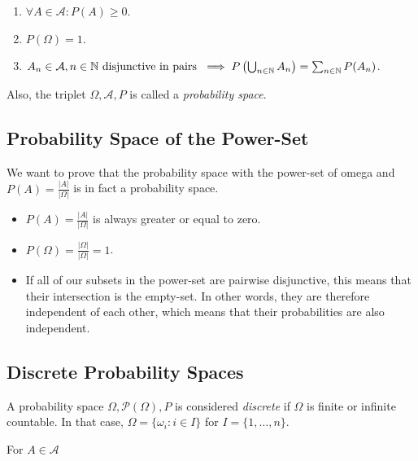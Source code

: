 \begin{enumerate}[label=\Roman*.]
    
    \item \(\forall A \in \mathcal{A}: P(A) \ge 0\).

    \item \(P(\Omega) = 1\).

    \item \(A_n \in \mathcal{A}, n \in \mathbb{N} \text{ disjunctive in pairs } \implies P\left(\bigcup_{n \in \mathbb{N}} A_n\right) = \sum_{n \in \mathbb{N}} P(A_n)\).

\end{enumerate}

Also, the triplet \(\Omega, \mathcal{A}, P\) is called a \emph{probability space}.

\subsection{Probability Space of the Power-Set}

We want to prove that the probability space with the power-set of omega and \(P(A) = \frac{|A|}{|\Omega|}\) is in fact a probability space. 

\begin{itemize}
    
    \item \(P(A) = \frac{|A|}{|\Omega|}\) is always greater or equal to zero.
    
    \item \(P(\Omega) = \frac{|\Omega|}{|\Omega|} = 1\).

    \item If all of our subsets in the power-set are pairwise disjunctive, this means that their intersection is the empty-set. In other words, 
          they are therefore independent of each other, which means that their probabilities are also independent.

\end{itemize}

\subsection{Discrete Probability Spaces}

A probability space \(\Omega, \mathcal{P}(\Omega), P\) is considered \emph{discrete} if 
\(\Omega\) is finite or infinite countable. In that case, \(\Omega = \{\omega_i : i \in I\}\) for \(I = \{1, \dots, n\}\).

For \(A \in \mathcal{A}\)

